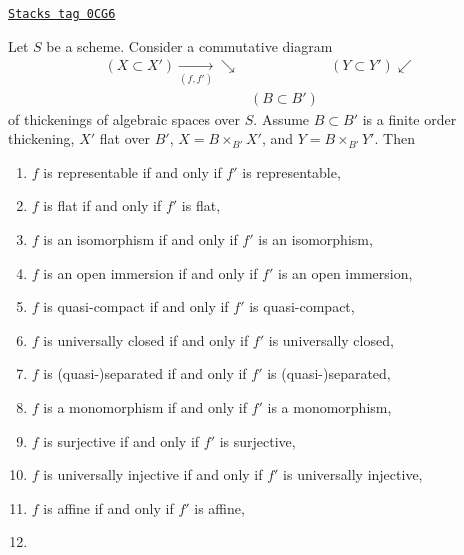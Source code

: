 \begin{lemma}
\label{spaces-more-morphisms-lemma-deform-property}
\href{https://stacks.math.columbia.edu/tag/0CG6}{\texttt{Stacks tag 0CG6}}

Let $S$ be a scheme. Consider a commutative diagram
$$
\begin{array}{ccc}(X \subset X') \underset{(f, f')}{\longrightarrow}\searrow &  & (Y \subset Y') \swarrow \\  & (B \subset B') & \end{array}
$$
of thickenings of algebraic spaces over $S$. Assume $B \subset B'$
is a finite order thickening, $X'$ flat over $B'$, $X = B \times_{B'} X'$,
and $Y = B \times_{B'} Y'$. Then
\begin{enumerate}
\item $f$ is representable if and only if $f'$ is representable,
\label{spaces-more-morphisms-item-representable}
\item $f$ is flat if and only if $f'$ is flat,
\label{spaces-more-morphisms-item-flat}
\item $f$ is an isomorphism if and only if $f'$ is an isomorphism,
\label{spaces-more-morphisms-item-isomorphism}
\item $f$ is an open immersion if and only if $f'$ is an open immersion,
\label{spaces-more-morphisms-item-open-immersion}
\item $f$ is quasi-compact if and only if $f'$ is quasi-compact,
\label{spaces-more-morphisms-item-quasi-compact}
\item $f$ is universally closed if and only if $f'$ is universally closed,
\label{spaces-more-morphisms-item-universally-closed}
\item $f$ is (quasi-)separated if and only if $f'$ is (quasi-)separated,
\label{spaces-more-morphisms-item-separated}
\item $f$ is a monomorphism if and only if $f'$ is a monomorphism,
\label{spaces-more-morphisms-item-monomorphism}
\item $f$ is surjective if and only if $f'$ is surjective,
\label{spaces-more-morphisms-item-surjective}
\item $f$ is universally injective if and only if $f'$ is universally injective,
\label{spaces-more-morphisms-item-universally-injective}
\item $f$ is affine if and only if $f'$ is affine,
\label{spaces-more-morphisms-item-affine}
\item
\label{spaces-more-morphisms-item-finite-type}

\end{enumerate}
\end{lemma}
